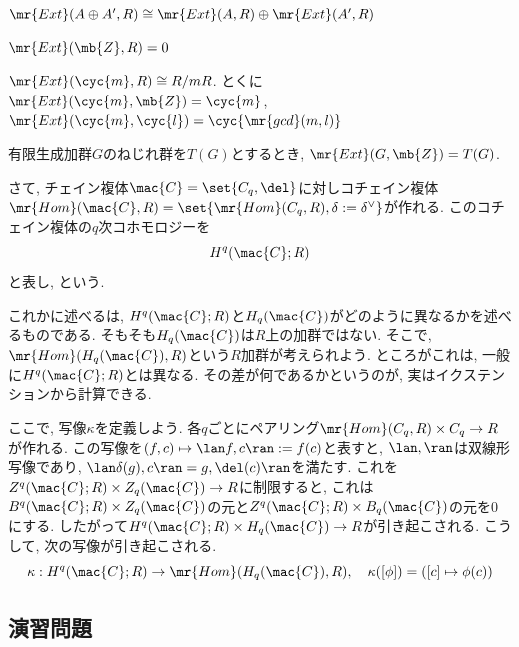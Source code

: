 \begin{prop}
\ben 
\item $\mr{Ext}(A\oplus A', R) \cong \mr{Ext}(A,R) \oplus \mr{Ext}(A',R) $ 
\item $\mr{Ext}(\mb{Z},R) = 0$ 
\item $\mr{Ext}(\cyc{m},R) \cong R/mR$. とくに$\mr{Ext}(\cyc{m},\mb{Z}) = \cyc{m}$, $\mr{Ext}(\cyc{m},\cyc{l}) = \cyc{\mr{gcd}(m,l)}$
\item 有限生成加群$G$のねじれ群を$T(G)$とするとき, $\mr{Ext}(G,\mb{Z}) = T(G)$. 
\een 
\end{prop}

さて, チェイン複体$\mac{C} = \set{C_q,\del}$に対しコチェイン複体$\mr{Hom}(\mac{C},R) = \set{\mr{Hom}(C_q,R), \delta := \delta^{\lor}}$が作れる. このコチェイン複体の$q$次コホモロジーを
\[H^q(\mac{C};R)\]
と表し, という. \par 
これかに述べるは, $H^{q}(\mac{C};R)$と$H_q(\mac{C})$がどのように異なるかを述べるものである. そもそも$H_q(\mac{C})$は$R$上の加群ではない. そこで, $\mr{Hom}(H_q(\mac{C}), R)$という$R$加群が考えられよう. ところがこれは, 一般に$H^q(\mac{C};R)$とは異なる. その差が何であるかというのが, 実はイクステンションから計算できる. \par 
ここで, 写像$\kappa$を定義しよう. 各$q$ごとにペアリング$\mr{Hom}(C_q,R)\times C_q\to R$が作れる. この写像を$(f,c) \mapsto \lan f,c\ran :=f(c)$と表すと, $\lan, \ran$は双線形写像であり, $\lan \delta(g), c\ran = g,\del(c)\ran$を満たす. これを$Z^q(\mac{C};R) \times Z_q(\mac{C})\to R$に制限すると, これは$B^q(\mac{C};R)\times Z_q(\mac{C})$の元と$Z^q(\mac{C};R)\times B_q(\mac{C})$の元を0にする. したがって$H^q(\mac{C};R) \times H_q(\mac{C}) \to R$が引き起こされる. こうして, 次の写像が引き起こされる. 
\[\kappa: H^q(\mac{C};R) \to \mr{Hom}(H_q(\mac{C}), R),\quad \kappa([\phi]) = ([c] \mapsto \phi(c))\]






\subsection{演習問題}

